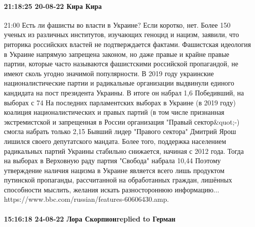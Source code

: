  
 
 
 
 

\paragraph{21:18:25 20-08-22 Кира Кира}

21:00
Есть ли фашисты во власти в Украине?
Если коротко, нет.
Более 150 ученых из различных институтов, изучающих геноцид и нацизм, заявили, что риторика российских властей не подтверждается фактами.
Фашистская идеология в Украине напрямую запрещена законом, но даже правые и крайне правые партии, которые часто называются фашистскими российской пропагандой, не имеют сколь угодно значимой популярности.
В 2019 году украинские националистические партии и радикальные организации выдвинули единого кандидата на пост президента Украины. В итоге он набрал 1,6%
Победивший, на выборах с 74%
На последних парламентских выборах в Украине (в 2019 году) коалиция националистических и правых партий (в том числе признанная экстремистской и запрещенная в России организация "Правый сектор&quot;-) смогла набрать только 2,15%
Бывший лидер "Правого сектора" Дмитрий Ярош лишился своего депутатского мандата.
Более того, поддержка населением радикальных партий Украины стабильно снижается, начиная с 2012 года. Тогда на выборах в Верховную раду партия "Свобода" набрала 10,44%
Поэтому утверждение наличия нацизма в Украине является всего лишь продуктом путинской пропаганды, рассчитанной на обработанных граждан, лишённых способности мыслить, желания искать разностороннюю информацию...
https://www.bbc.com/russian/features-60606430.amp.

\paragraph{15:16:18 24-08-22 Лора Скорпионreplied to Герман}

